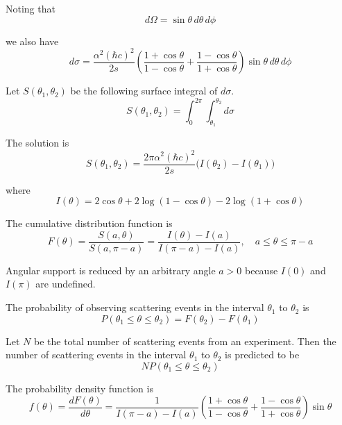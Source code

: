 \documentclass[12pt]{article}
\begin{document}
Noting that
\begin{equation*}
d\Omega=\sin\theta\,d\theta\,d\phi
\end{equation*}

we also have
\begin{equation*}
d\sigma=
\frac{\alpha^2(\hbar c)^2}{2s}
\left(
\frac{1+\cos\theta}{1-\cos\theta}+
\frac{1-\cos\theta}{1+\cos\theta}
\right)\sin\theta\,d\theta\,d\phi
\end{equation*}

Let $S(\theta_1,\theta_2)$ be the following surface integral of $d\sigma$.
\begin{equation*}
S(\theta_1,\theta_2)=\int_0^{2\pi}\int_{\theta_1}^{\theta_2}d\sigma
\end{equation*}

The solution is
\begin{equation*}
S(\theta_1,\theta_2)=\frac{2\pi\alpha^2(\hbar c)^2}{2s}
\bigl(I(\theta_2)-I(\theta_1)\bigr)
\end{equation*}

where
\begin{equation*}
I(\theta)=2\cos\theta+2\log(1-\cos\theta)-2\log(1+\cos\theta)
\end{equation*}

The cumulative distribution function is
\begin{equation*}
F(\theta)
=\frac{S(a,\theta)}{S(a,\pi-a)}
=\frac{I(\theta)-I(a)}{I(\pi-a)-I(a)},
\quad
a\le\theta\le\pi-a
\end{equation*}

Angular support is reduced by an arbitrary angle $a>0$ because $I(0)$ and $I(\pi)$ are undefined.

\bigskip
The probability of observing scattering events in the interval $\theta_1$ to $\theta_2$ is
\begin{equation*}
P(\theta_1\le\theta\le\theta_2)=F(\theta_2)-F(\theta_1)
\end{equation*}

Let $N$ be the total number of scattering events from an experiment.
Then the number of scattering events in the interval $\theta_1$
to $\theta_2$ is predicted to be
\begin{equation*}
NP(\theta_1\le\theta\le\theta_2)
\end{equation*}

The probability density function is
\begin{equation*}
f(\theta)=\frac{dF(\theta)}{d\theta}
=\frac{1}{I(\pi-a)-I(a)}
\left(\frac{1+\cos\theta}{1-\cos\theta}+\frac{1-\cos\theta}{1+\cos\theta}\right)
\sin\theta
\end{equation*}
\end{document}
